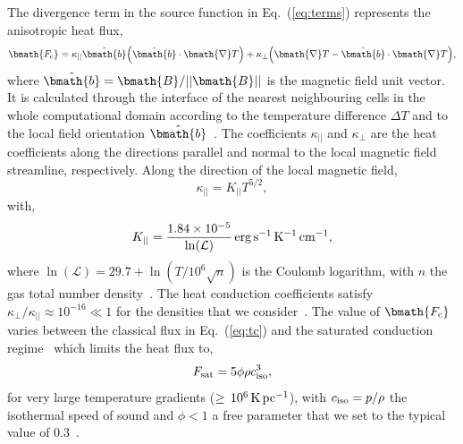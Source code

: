\documentclass[useAMS,usenatbib]{mn2e}
\begin{document}
The divergence term in the source function in Eq.~(\ref{eq:terms}) represents 
the anisotropic heat flux, 
%
\begin{equation}
      \bmath{{F}_{\rm c}} = \kappa_{||} \hat{\bmath{b}} \Big(  \hat{\bmath{b}} \cdot \bmath{ \nabla } T  \Big) + \kappa_{\perp} \Big( \bmath{ \nabla } T  -  \hat{\bmath{b}} \cdot \bmath{ \nabla } T  \Big),
\label{eq:tc}
\end{equation}
%
where $\hat{\bmath{b}}=\bmath{B}/||\textcolor{black}{\bmath{B}}||$ is the magnetic field unit vector. It is
calculated through the interface of the nearest neighbouring cells in the whole
computational domain according to the temperature difference $\Delta T$ and to
the local field orientation $\hat{\bmath{b}}$~\citep[\textcolor{black}{see appendix of}][]{migmone_apjs_198_2012}.
The coefficients $\kappa_{||}$ and $\kappa_{\perp}$ are the heat coefficients
along the directions parallel and normal to the local magnetic field streamline,
respectively.   Along the direction of the local magnetic field, 
%
\begin{equation}
      \kappa_{||}=K_{||} T^{5/2},
      \label{fig:eq_kappa_par}
\end{equation}
%
with,
%
\begin{equation}
      K_{||} =  \frac{ 1.84 \times 10^{-5} }{ \ln( \mathcal{L} ) }\, \rm erg\, \rm s^{-1}\, \rm K^{-1}\, \rm cm^{-1},
      \label{fig:eq_kappa}
\end{equation}
%
where $\ln( \mathcal{L} ) = 29.7 + \ln ( T / 10^{6}\sqrt{n}) $ is the Coulomb
logarithm, with $n$ the gas total number density~\citep{spitzer_1962}. The heat
conduction coefficients satisfy $\kappa_{\perp}/\kappa_{||} \approx 10^{-16} \ll 1$ for the
densities that we
consider~\citep{parker_1963_book,velazquez_apj_601_2004,balsara_mnras_386_2008,
orlando_apj_678_2008}. The value of $\textcolor{black}{\bmath{{F}_{\rm c}}}$ varies between the
classical flux in Eq.~(\ref{eq:tc}) and the saturated conduction
regime~\citep{balsara_mnras_386_2008} which limits the heat flux to, 
%
\begin{equation}
    F_{\rm sat} = 5 \phi \rho c_{\rm iso}^{3},
    \label{fig:eq_sat}
\end{equation}
%
for very large temperature gradients (\textcolor{black}{$\ge\, 10^{6}\, \rm K\, \rm pc^{-1}$}), with 
$ c_{\rm iso} = p/\rho$ the isothermal speed of sound and $\phi<1$ a 
free parameter that we set to the typical value of $0.3$~\citep{cowie_apj_211_1977}. 
\end{document}
